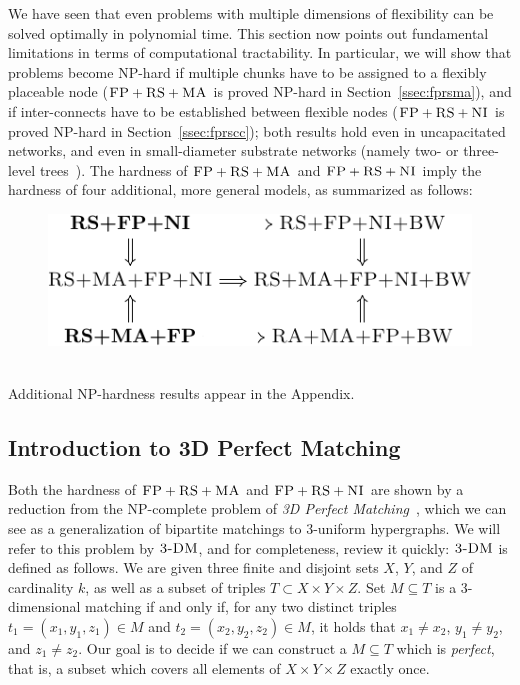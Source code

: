 \documentclass[9pt]{sigcomm-alternate}
\newcommand{\maciek}[1]{\textcolor{brown}{maciek: #1}}
\newcommand{\CC}{\textsc{NI}}
\newcommand{\FP}{\textsc{FP}}
\newcommand{\RS}{\textsc{RS}}
\newcommand{\MA}{\textsc{MA}}
\newcommand{\TDM}{\textsc{3-DM}}
\begin{document}
We have seen that even problems with multiple dimensions of
flexibility can be solved optimally in polynomial time.
This section now points out fundamental
limitations in terms of computational tractability. In particular, we
will show that problems become NP-hard if multiple chunks have to be
assigned to a flexibly placeable node ($\FP+\RS+\MA$ is proved NP-hard in
Section~\ref{ssec:fprsma}), and if inter-connects have to be established
between flexible nodes ($\FP+\RS+\CC$ is proved NP-hard in Section~\ref{ssec:fprscc}); both
results hold even in uncapacitated networks, and even in small-diameter
substrate networks (namely two- or three-level trees~\cite{fattree}).
The hardness of $\FP+\RS+\MA$ and $\FP+\RS+\CC$ imply
the hardness of four additional, more general models, as
summarized as follows:\\
\begin{figure}[h!]
\includegraphics[width = \columnwidth]{figs/np_implications}
\end{figure}\\
Additional NP-hardness results appear in the Appendix.


\subsection{Introduction to 3D Perfect Matching}
\label{sec:3dm_intro}

Both the hardness of $\FP+\RS+\MA$ and $\FP+\RS+\CC$ are shown by a reduction
from the NP-complete problem of \emph{3D Perfect Matching}~\cite{3dmatch},
which we can see as a generalization of bipartite matchings to 3-uniform
hypergraphs. We will refer to this problem by $\TDM$, and for completeness,
review it quickly:
$\TDM$ is defined as follows. We are given three finite and disjoint
sets $X$, $Y$, and $Z$ of cardinality $k$, as well as a subset of triples $T\subset
X \times Y \times Z$.  Set $M \subseteq T$ is a 3-dimensional matching
if and only if, for any two distinct triples $t_1=(x_1, y_1, z_1) \in M$
and $t_2=(x_2, y_2, z_2) \in M$, it holds that $x_1\neq x_2$, $y_1\neq
y_2$, and $z_1\neq z_2$. Our goal is to decide if we can construct
a $M \subseteq T$ which is \emph{perfect}, that is, a subset which covers all
elements of $X \times Y \times Z$ exactly once.
\end{document}
